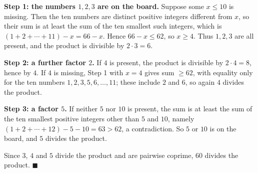 \textbf{Step 1: the numbers $1,2,3$ are on the board.} Suppose some $x\le10$ is missing. Then the ten numbers are distinct positive integers different from $x$, so their sum is at least the sum of the ten smallest such integers, which is $(1+2+\cdots+11)-x=66-x$. Hence $66-x\le62$, so $x\ge4$. Thus $1,2,3$ are all present, and the product is divisible by $2\cdot3=6$.

\textbf{Step 2: a further factor $2$.} If $4$ is present, the product is divisible by $2\cdot4=8$, hence by $4$. If $4$ is missing, Step 1 with $x=4$ gives sum $\ge62$, with equality only for the ten numbers $1,2,3,5,6,\dots,11$; these include $2$ and $6$, so again $4$ divides the product.

\textbf{Step 3: a factor $5$.} If neither $5$ nor $10$ is present, the sum is at least the sum of the ten smallest positive integers other than $5$ and $10$, namely $(1+2+\cdots+12)-5-10=63>62$, a contradiction. So $5$ or $10$ is on the board, and $5$ divides the product.

Since $3$, $4$ and $5$ divide the product and are pairwise coprime, $60$ divides the product. $\blacksquare$
